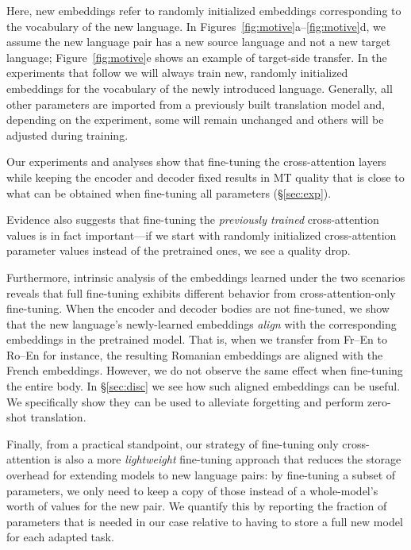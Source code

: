 Here, new embeddings refer to randomly initialized embeddings corresponding to the vocabulary of the new language. In Figures~\ref{fig:motive}a--\ref{fig:motive}d, we assume the new language pair has a new source language and not a new target language; Figure~\ref{fig:motive}e shows an example of target-side transfer. In the experiments that follow we will always train new, randomly initialized embeddings for the vocabulary of the newly introduced language. Generally, all other parameters are imported from a previously built translation model and, depending on the experiment, some will remain unchanged and others will be adjusted during training. 

Our experiments and analyses show that fine-tuning the cross-attention layers while keeping the encoder and decoder fixed results in MT quality that is close to what can be obtained when fine-tuning all parameters (\S\ref{sec:exp}).

Evidence also suggests that fine-tuning the \textit{previously trained} cross-attention values is in fact important---if we start with randomly initialized cross-attention parameter values instead of the pretrained ones, we see a quality drop.

Furthermore, intrinsic analysis of the embeddings learned under the two scenarios reveals that full fine-tuning exhibits different behavior from cross-attention-only fine-tuning. When the encoder and decoder bodies are not fine-tuned, we show that the new language's newly-learned embeddings \textit{align} with the corresponding embeddings in the pretrained model. That is, when we transfer from Fr--En to Ro--En for instance, the resulting Romanian embeddings are aligned with the French embeddings. However, we do not observe the same effect when fine-tuning the entire body. In \S\ref{sec:disc} we see how such aligned embeddings can be useful. We specifically show they can be used to alleviate forgetting and perform zero-shot translation.

Finally, from a practical standpoint, our strategy of fine-tuning only cross-attention is also a more \textit{lightweight} fine-tuning approach \cite{houlsby2019parameter} that reduces the storage overhead for extending models to new language pairs: by fine-tuning a subset of parameters, we only need to keep a copy of those instead of a whole-model's worth of values for the new pair. We quantify this by reporting the fraction of parameters that is needed in our case relative to having to store a full new model for each adapted task.

